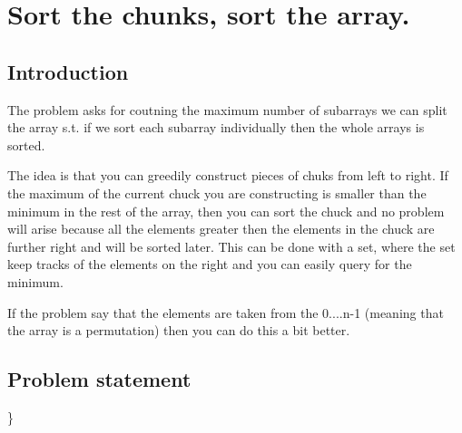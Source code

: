 %



\chapter{Sort the chunks, sort the array.}
\label{ch:max_num_chunks_sorted}
\section*{Introduction}
The problem asks for coutning the maximum number of subarrays we can split the array s.t. if we sort
each subarray individually then the whole arrays is sorted.

The idea is that you can greedily construct pieces of chuks from left to right. If the maximum of
the current chuck you are constructing is smaller than the minimum in the rest of the array, then
you can sort the chuck and no problem will arise because all the elements greater then the elements
in the chuck are further right and will be sorted later. This can be done with a set, where the set
keep tracks of the elements on the right and you can easily query for the minimum.



If the problem say that the elements are taken from the 0....n-1 (meaning that the array is a
permutation) then you can do this a bit better. 
\section{Problem statement}
\begin{exercise}
\label{example:max_num_chunks_sorted:exercice1}

	\begin{example}
		\label{example:max_num_chunks_sorted:example1}
		\hfill \}
		
	\end{example}

	\begin{example}
		\label{example:max_num_chunks_sorted:example2}
		\hfill \
		
	\end{example}

	\begin{example}
		\hfill \
	
	\label{ex:max_num_chunks_sorted:example1}
	\end{example}

	\begin{example}
		\hfill \

	\label{ex:max_num_chunks_sorted:example2}	
	\end{example}
\end{exercise}

